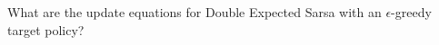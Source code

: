 
\begin{exercise}[Exercise 6.13]

What are the update equations for Double Expected Sarsa with an $\epsilon$-greedy
target policy?

\end{exercise}


\begin{solution}

\phantom{}

\end{solution}

